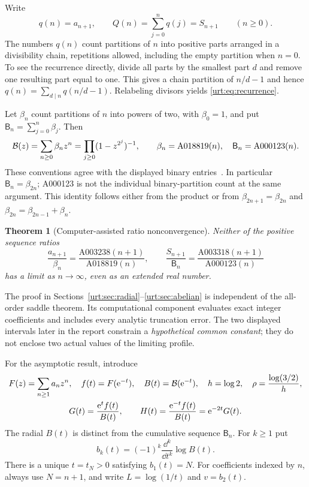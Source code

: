 \documentclass[11pt,letterpaper]{article}
\newtheorem{theorem}{Theorem}[section]
\theoremstyle{remark}\newtheorem{remark}[theorem]{Remark}
\newcommand{\Beta}{\mathsf B}
\begin{document}
Write
\begin{equation}\label{urt:eq:offsets}
 q(n)=a_{n+1},\qquad Q(n)=\sum_{j=0}^nq(j)=S_{n+1}\qquad(n\ge0).
\end{equation}
The numbers $q(n)$ count partitions of $n$ into positive parts arranged in a divisibility chain, repetitions allowed, including the empty partition when $n=0$. To see the recurrence directly, divide all parts by the smallest part $d$ and remove one resulting part equal to one. This gives a chain partition of $n/d-1$ and hence $q(n)=\sum_{d\mid n}q(n/d-1)$. Relabeling divisors yields \eqref{urt:eq:recurrence}.

Let $\beta_n$ count partitions of $n$ into powers of two, with $\beta_0=1$, and put $\Beta_n=\sum_{j=0}^n\beta_j$. Then
\begin{equation}\label{urt:eq:binary}
 \Bc(z)=\sum_{n\ge0}\beta_nz^n=\prod_{j\ge0}(1-z^{2^j})^{-1},\qquad
 \beta_n=\mathrm{A018819}(n),\quad \Beta_n=\mathrm{A000123}(n).
\end{equation}
These conventions agree with the displayed binary entries~\cite{oeisbinary}. In particular $\Beta_n=\beta_{2n}$; A000123 is not the individual binary-partition count at the same argument. This identity follows either from the product or from $\beta_{2n+1}=\beta_{2n}$ and $\beta_{2n}=\beta_{2n-1}+\beta_n$.

\begin{theorem}[Computer-assisted ratio nonconvergence]\label{urt:thm:nonconvergence}
Neither of the positive sequence ratios
\[
 \frac{a_{n+1}}{\beta_n}
 =\frac{\mathrm{A003238}(n+1)}{\mathrm{A018819}(n)},\qquad
 \frac{S_{n+1}}{\Beta_n}
 =\frac{\mathrm{A003318}(n+1)}{\mathrm{A000123}(n)}
\]
has a limit as $n\to\infty$, even as an extended real number.
\end{theorem}
The proof in Sections~\ref{urt:sec:radial}--\ref{urt:sec:abelian} is independent of the all-order saddle theorem. Its computational component evaluates exact integer coefficients and includes every analytic truncation error. The two displayed intervals later in the report constrain a \emph{hypothetical common constant}; they do not enclose two actual values of the limiting profile.

For the asymptotic result, introduce
\begin{equation}\label{urt:eq:radialdefs}
 \begin{gathered}
 F(z)=\sum_{n\ge1}a_nz^n,\quad f(t)=F(\mathrm e^{-t}),\quad B(t)=\mathcal B(\mathrm e^{-t}),\quad h=\log2,\quad \rho=\frac{\log(3/2)}{h},\\
 G(t)=\frac{\mathrm e^tf(t)}{B(t)},\qquad H(t)=\frac{\mathrm e^{-t}f(t)}{B(t)}=\mathrm e^{-2t}G(t).
 \end{gathered}
\end{equation}
The radial $B(t)$ is distinct from the cumulative sequence $\Beta_n$. For $k\ge1$ put
\begin{equation}\label{urt:eq:cumulants}
 b_k(t)=(-1)^k\frac{\dd^k}{\dd t^k}\log B(t).
\end{equation}
There is a unique $t=t_N>0$ satisfying $b_1(t)=N$. For coefficients indexed by $n$, always use $N=n+1$, and write $L=\log(1/t)$ and $v=b_2(t)$.
\end{document}
